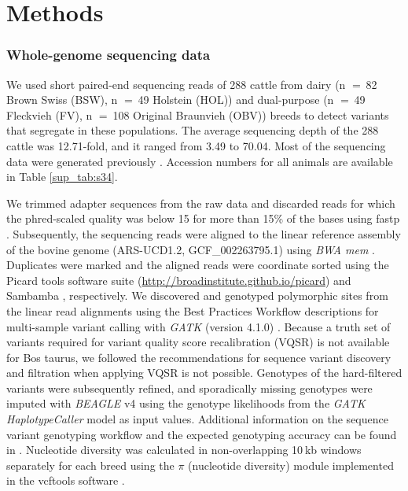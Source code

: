 \documentclass[../main.tex]{subfiles}
\begin{document}
\section{Methods}

\subsubsection*{Whole-genome sequencing data}

We used short paired-end sequencing reads of 288 cattle from dairy (n $=$ 82 Brown Swiss (BSW), n $=$ 49 Holstein (HOL)) and dual-purpose (n $=$ 49 Fleckvieh (FV), n $=$ 108 Original Braunvieh (OBV)) breeds to detect variants that segregate in these populations. The average sequencing depth of the 288 cattle was 12.71-fold, and it ranged from 3.49 to 70.04. Most of the sequencing data were generated previously \citep{daetwyler2014whole,crysnanto2019accurate,jansen2013assessment,baes2014evaluation,hofstetter2019non}. Accession numbers for all animals are available in Table \ref{sup_tab:s34}.

We trimmed adapter sequences from the raw data and discarded reads for which the phred-scaled quality was below 15 for more than 15\% of the bases using fastp \citep{chen2018fastp}. Subsequently, the sequencing reads were aligned to the linear reference assembly of the bovine genome (ARS-UCD1.2, GCF\_002263795.1) using \emph{BWA mem} \citep{li2013aligning}. 
Duplicates were marked and the aligned reads were coordinate sorted using the Picard tools software suite (\url{http://broadinstitute.github.io/picard}) and Sambamba \citep{tarasov2015sambamba}, respectively. We discovered and genotyped polymorphic sites from the linear read alignments using the Best Practices Workflow descriptions for multi-sample variant calling with \emph{GATK} (version 4.1.0) \citep{depristo2011framework}. Because a truth set of variants required for variant quality score recalibration (VQSR) is not available for Bos taurus, we followed the recommendations for sequence variant discovery and filtration when applying VQSR is not possible. Genotypes of the hard-filtered variants were subsequently refined, and sporadically missing genotypes were imputed with \emph{BEAGLE} v4 \citep{browning2016genotype} using the genotype likelihoods from the \emph{GATK HaplotypeCaller} model as input values. Additional information on the sequence variant genotyping workflow and the expected genotyping accuracy can be found in \citet{crysnanto2019accurate}. Nucleotide diversity was calculated in non-overlapping 10 kb windows separately for each breed using the $\pi$ (nucleotide diversity) module implemented in the vcftools software \citep{danecek2011variant}.
\end{document}
